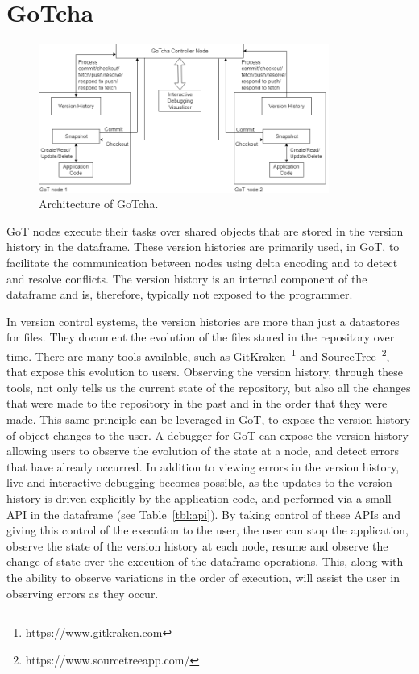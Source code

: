 \section{GoTcha}
\label{sec:debug_arch}

\begin{figure}
\centering
\includegraphics[width=0.85\textwidth]{images/debug_arch.png}
\caption{Architecture of GoTcha.}
\label{fig:proto_arch}
\end{figure}

GoT nodes execute their tasks over shared objects that are stored in the version history in the dataframe. These version histories are primarily used, in GoT, to facilitate the communication between nodes using delta encoding and to detect and resolve conflicts. The version history is an internal component of the dataframe and is, therefore, typically not exposed to the programmer. 

In version control systems, the version histories are more than just a datastores for files. They document the evolution of the files stored in the repository over time. There are many tools available, such as GitKraken~\footnote{https://www.gitkraken.com} and SourceTree~\footnote{https://www.sourcetreeapp.com/}, that expose this evolution to users. Observing the version history, through these tools, not only tells us the current state of the repository, but also all the changes that were made to the repository in the past and in the order that they were made. This same principle can be leveraged in GoT, to expose the version history of object changes to the user. A debugger for GoT can expose the version history allowing users to observe the evolution of the state at a node, and detect errors that have already occurred. In addition to viewing errors in the version history, live and interactive debugging becomes possible, as the updates to the version history is driven explicitly by the application code, and performed via a small API in the dataframe (see Table~\ref{tbl:api}). By taking control of these APIs and giving this control of the execution to the user, the user can stop the application, observe the state of the version history at each node, resume and observe the change of state over the execution of the dataframe operations. This, along with the ability to observe variations in the order of execution, will assist the user in observing errors as they occur. 

